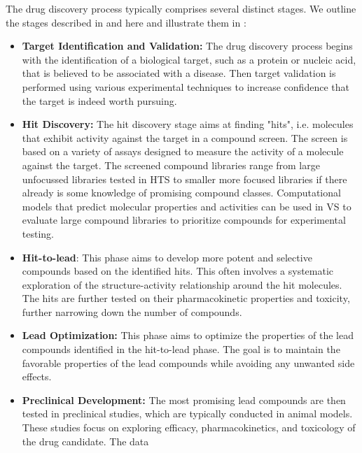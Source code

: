 The drug discovery process typically comprises several distinct stages. We outline the stages
described in \citet{hughesPrinciplesEarlyDrug2011} and \citep{umscheidKeyConceptsClinical2011} here and illustrate them in :
\begin{itemize}
    \item \textbf{Target Identification and Validation:} The drug discovery process begins with
          the identification of a biological target, such as a protein or nucleic acid, that is
          believed to be associated with a disease. Then target validation is performed using
          various experimental techniques to increase confidence that the target is indeed worth
          pursuing.
    \item \textbf{Hit Discovery:} The hit discovery stage aims at finding "hits", i.e. molecules that
          exhibit activity against the target in a compound screen. The screen is based on a
          variety of assays designed to measure the activity of a molecule against the target. The
          screened compound libraries range from large unfocussed libraries tested in \ac{HTS} to
          smaller more focused libraries if there already is some knowledge of promising compound
          classes. Computational models that predict molecular properties and activities can be
          used in \ac{VS} \citep{waltersVirtualScreeningOverview1998,shoichetVirtualScreeningChemical2004a} to evaluate large compound libraries to prioritize compounds for
          experimental testing.
    \item \textbf{Hit-to-lead}: This phase aims to develop more potent and selective compounds
          based on the identified hits. This often involves a systematic exploration of the
          structure-activity relationship around the hit molecules.  The hits are further tested on
          their pharmacokinetic properties and toxicity, further narrowing down the number of
          compounds.
    \item \textbf{Lead Optimization:} This phase aims to optimize the properties of the
          lead compounds identified in the hit-to-lead phase. The goal is to maintain the favorable
          properties of the lead compounds while avoiding any unwanted side effects.
    \item \textbf{Preclinical Development:} The most promising lead compounds are then tested in
          preclinical studies, which are typically conducted in animal models. These studies focus
          on exploring efficacy, pharmacokinetics, and toxicology of the drug candidate. The data

\end{itemize}
